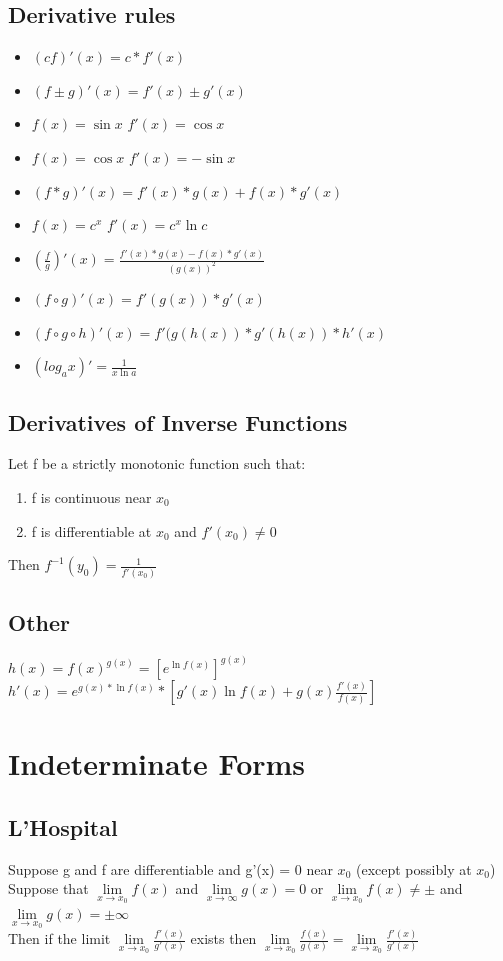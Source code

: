 \documentclass{article}
\begin{document}
\subsection{Derivative rules}
\begin{itemize}
	\item $ (cf)'(x) = c * f'(x)$
	\item $ (f \pm g)'(x) = f'(x) \pm g'(x) $
	\item $ f(x) = \sin x$  $ f'(x) = \cos x$
	\item $ f(x) = \cos x$  $ f'(x) = -\sin x $
	\item $ (f*g)'(x) = f'(x)*g(x) + f(x)*g'(x)$
	\item $ f(x) = c^x $  $ f'(x) = c^x \ln c $
	\item $ (\frac{f}{g})'(x) = \frac{f'(x)*g(x) - f(x)*g'(x)}{(g(x))^2}$
	\item $ (f \circ g)'(x) = f'(g(x)) * g'(x) $
	\item $ (f \circ g \circ h)'(x) = f'(g(h(x)) * g'(h(x)) * h'(x) $
	\item $ (log_a x)' = \frac{1}{x \ln a} $
\end{itemize}

\subsection{Derivatives of Inverse Functions}
Let f be a strictly monotonic function such that:
\begin{enumerate}
	\item f is continuous near $x_0$
	\item f is differentiable at $x_0$ and $f'(x_0) \neq 0$
\end{enumerate} 
Then $f^{-1}(y_0) = \frac{1}{f'(x_0)}$
 
\subsection{Other}
$h(x) = f(x)^{g(x)} = [e^{\ln f(x)}]^{g(x)}$  \\
$h'(x) = e^{g(x) * \ln f(x)} * [g'(x)\ln f(x) + g(x)\frac{f'(x)}{f(x)}]$
 
 
 \section{Indeterminate Forms}
 \subsection{L'Hospital}
 Suppose g and f are differentiable and g'(x) = 0 near $x_0$ (except possibly at $x_0$)\\
 Suppose that $\lim\limits_{x\to x_0} f(x)$ and $ \lim\limits_{x\to\infty} g(x)=0$ or $\lim\limits_{x\to x_0} f(x) \neq \pm$ and $\lim\limits_{x\to x_0}g(x) = \pm\infty$\\ 
 Then if the limit $\lim\limits_{x\to x_0} \frac{f'(x)}{g'(x)}$ exists then $ \lim\limits_{x\to x_0}  \frac{f(x)}{g(x)} = \lim\limits_{x\to x_0}  \frac{f'(x)}{g'(x)} $
 
\end{document}
